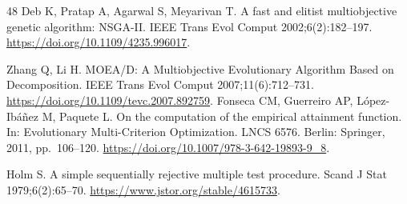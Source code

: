 \begin{thebibliography}{48}
Deb K, Pratap A, Agarwal S, Meyarivan T. A fast and elitist multiobjective genetic algorithm: NSGA-II.
IEEE Trans Evol Comput 2002;6(2):182--197.
\url{https://doi.org/10.1109/4235.996017}.

Zhang Q, Li H. MOEA/D: A Multiobjective Evolutionary Algorithm Based on Decomposition.
IEEE Trans Evol Comput 2007;11(6):712--731.
\url{https://doi.org/10.1109/tevc.2007.892759}.
Fonseca CM, Guerreiro AP, López-Ibáñez M, Paquete L. On the computation of the empirical attainment function.
In: Evolutionary Multi-Criterion Optimization. LNCS 6576. Berlin: Springer, 2011, pp.~106--120.
\url{https://doi.org/10.1007/978-3-642-19893-9_8}.

Holm S. A simple sequentially rejective multiple test procedure.
Scand J Stat 1979;6(2):65--70.
\url{https://www.jstor.org/stable/4615733}.
\end{thebibliography}
